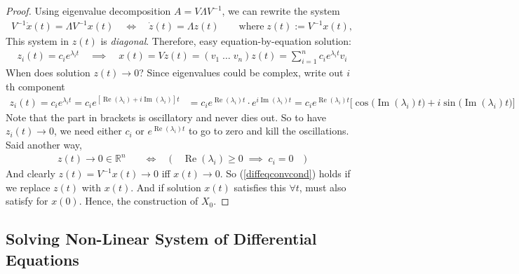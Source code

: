 \documentclass[12pt]{article}
\numberwithin{equation}{section} %
\theoremstyle{plain}
\theoremstyle{definition}
\theoremstyle{remark}
\newcommand{\ra}{\rightarrow}
\newcommand{\dx}{\dot{x}}
\newcommand{\dz}{\dot{z}}
\newcommand{\Rn}{\mathbb{R}^n}
\renewcommand{\Re}{\operatorname{Re}}
\renewcommand{\Im}{\operatorname{Im}}
\newcommand{\sumin}{\sum^n_{i=1}}
\begin{document}
\begin{proof}
Using eigenvalue decomposition $A=V\Lambda V^{-1}$, we can rewrite the
system
\begin{align*}
  V^{-1}\dx(t) = \Lambda V^{-1}x(t)
  \quad\iff\quad
  \dz(t) = \Lambda z(t)
  \qquad \text{where} \; z(t) := V^{-1}x(t),
\end{align*}
This system in $z(t)$ is \emph{diagonal}. Therefore, easy
equation-by-equation solution:
\begin{align*}
  z_i(t) =
  c_i e^{\lambda_i t}
  \quad\implies\quad
  x(t) = V z(t)
  = (v_1\;\ldots\;v_n) z(t)
  = \sumin c_i e^{\lambda_i t}v_i
\end{align*}
When does solution $z(t)\ra 0$?
Since eigenvalues could be complex, write out $i$th component
\begin{align*}
  z_i(t)
  =
  c_i e^{\lambda_it}
  =
  c_i e^{[\Re(\lambda_i) + i\Im(\lambda_i)]t}
  &=
  c_i e^{\Re(\lambda_i)t} \cdot e^{i\Im(\lambda_i)t}
  =
  c_i e^{\Re(\lambda_i)t}
  \big[
  \cos\big(\Im(\lambda_i) t\big) + i \sin\big(\Im(\lambda_i) t\big)
  \big]
\end{align*}
Note that the part in brackets is oscillatory and never dies out.
So to have $z_i(t)\ra 0$, we need either $c_i$ or $e^{\Re(\lambda_i)t}$
to go to zero and kill the oscillations. Said another way,
\begin{align}
  z(t)
  \ra 0\in\Rn
  \quad&\iff\quad
  \big(\quad
  \Re(\lambda_i) \geq 0
  \;\implies\; c_i=0
  \quad\big)
  \label{diffeqconvcond}
\end{align}
And clearly $z(t)=V^{-1}x(t)\ra 0$ iff $x(t)\ra 0$.
So (\ref{diffeqconvcond}) holds if we replace $z(t)$ with $x(t)$.
And if solution $x(t)$ satisfies this $\forall t$, must also satisfy for
$x(0)$.
Hence, the construction of $X_0$.
\end{proof}


\subsection{Solving Non-Linear System of Differential Equations}
\end{document}
